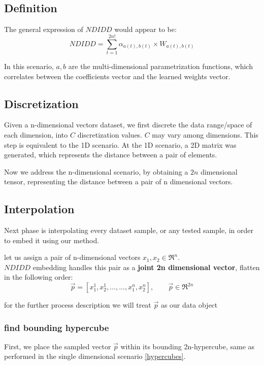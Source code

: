 \begin{}
	\subsection{Definition}
	
	The general expression of $NDIDD$ would appear to be:
	\begin{equation}
			NDIDD = \sum_{t=1}^{2n!}\alpha_{a(t),b(t)} \times W_{a(t),b(t)}
	\end{equation}
	
	In this scenario, $a , b$ are the multi-dimensional parametrization functions, which correlates between the coefficients vector and the learned weights vector.

		
	\subsection{Discretization}
	Given a n-dimensional vectors dataset, we first discrete the data range/space of each dimension, into $C$ discretization values. 
	$C$ may vary among dimensions. This step is equivalent to the 1D scenario.
	At the 1D scenario, a 2D matrix was generated, which represents the distance between a pair of elements.
	
	Now we address the n-dimensional scenario, by obtaining a $2n$ dimensional tensor, representing the distance between a pair of n dimensional vectors.
	
	\subsection{Interpolation}
	
	Next phase is interpolating every dataset sample, or any tested sample, in order to embed it using our method.
	
	let us assign a pair of n-dimensional vectors $x_1 , x_2 \in \Re^n$.\\
	$NDIDD$ embedding handles this pair as a \textbf{joint 2n dimensional vector}, flatten in the following order:\\
	\begin{equation}
		\overrightarrow{p} = [x_1^1 , x_2^1 , ... , ... , x_1^n , x_2^n] ,\qquad \overrightarrow{p} \in \Re^{2n}
	\end{equation}
	
	for the further process description we will treat $\overrightarrow{p}$ as our data object
	
	
		\subsubsection{find bounding hypercube}
		First, we place the sampled vector $\overrightarrow{p}$ within its bounding 2n-hypercube, same as performed in the single dimensional scenario \ref{hypercubes}.  
			

\end{}

